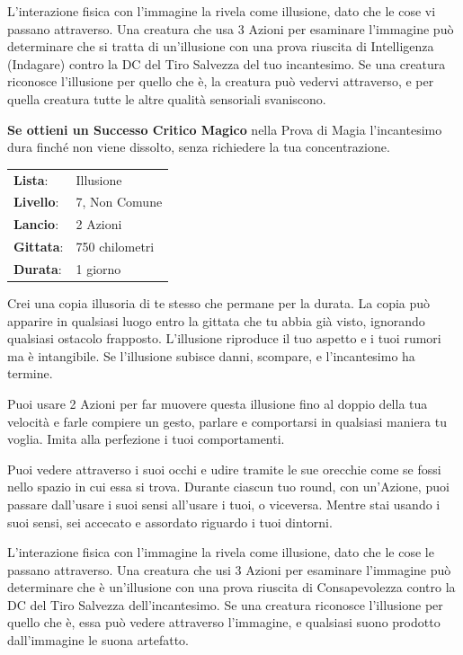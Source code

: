 \begin{multicols}{2}
L'interazione fisica con l'immagine la rivela come illusione, dato che le cose vi passano attraverso. Una creatura che usa 3 Azioni per esaminare l'immagine può determinare che si tratta di un'illusione con una prova riuscita di Intelligenza (Indagare) contro la DC del Tiro Salvezza del tuo incantesimo. Se una creatura riconosce l'illusione per quello che è, la creatura può vedervi attraverso, e per quella creatura tutte le altre qualità sensoriali svaniscono.

\textbf{Se ottieni un Successo Critico Magico} nella Prova di Magia l'incantesimo dura finché non viene dissolto, senza richiedere la tua concentrazione.

\noindent\begin{tabularx}{\linewidth}{p{1.3cm}X}
	\rowcolor{gray!20}\textbf{Lista}: & Illusione \\
	\textbf{Livello}: & 7, Non Comune \\
	\rowcolor{gray!20}\textbf{Lancio}: & 2 Azioni \\
	\textbf{Gittata}: & 750 chilometri \\
	\rowcolor{gray!20}\textbf{Durata}: & 1 giorno \\
\end{tabularx}\smallskip

Crei una copia illusoria di te stesso che permane per la durata. La copia può apparire in qualsiasi luogo entro la gittata che tu abbia già visto, ignorando qualsiasi ostacolo frapposto. L'illusione riproduce il tuo aspetto e i tuoi rumori ma è intangibile. Se l'illusione subisce danni, scompare, e l'incantesimo ha termine.

Puoi usare 2 Azioni per far muovere questa illusione fino al doppio della tua velocità e farle compiere un gesto, parlare e comportarsi in qualsiasi maniera tu voglia. Imita alla perfezione i tuoi comportamenti.

Puoi vedere attraverso i suoi occhi e udire tramite le sue orecchie come se fossi nello spazio in cui essa si trova. Durante ciascun tuo round, con un'Azione, puoi passare dall'usare i suoi sensi all'usare i tuoi, o viceversa. Mentre stai usando i suoi sensi, sei accecato e assordato riguardo i tuoi dintorni.

L'interazione fisica con l'immagine la rivela come illusione, dato che le cose le passano attraverso. Una creatura che usi 3 Azioni per esaminare l'immagine può determinare che è un'illusione con una prova riuscita di Consapevolezza contro la DC del Tiro Salvezza dell'incantesimo. Se una creatura riconosce l'illusione per quello che è, essa può vedere attraverso l'immagine, e qualsiasi suono prodotto dall'immagine le suona artefatto.


\end{multicols}
